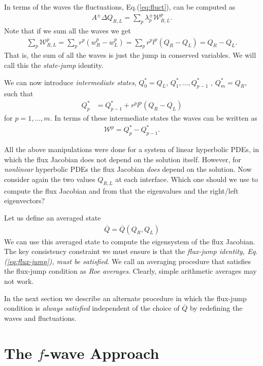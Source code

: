 \documentclass[12pt]{article}
\theoremstyle{definition}
\theoremstyle{definition}
\theoremstyle{definition}
\newcommand{\eqr}[1]{Eq.\thinspace(#1)}
\begin{document}
In terms of the waves the fluctuations, \eqr{\ref{eq:fluct}}, can be
computed as
\begin{align}
  A^\pm\Delta Q_{R,L} = \sum_p \lambda^\pm_p \mathcal{W}_{R,L}^p.
\end{align}
Note that if we sum all the waves we get
\begin{align}
  \sum_p \mathcal{W}_{R,L}^p = \sum_p r^p (w_R^p-w_L^p) = \sum_p  r^p  l^p(Q_R-Q_L) = Q_R-Q_L.
  \label{eq:state-jump}
\end{align}
That is, the sum of all the waves is just the jump in conserved
variables. We will call this the \emph{state-jump} identity.

We can now introduce \emph{intermediate states}, $Q_0^* = Q_L$,
$Q^*_1, \ldots, Q_{p-1}^*$ , $Q_m^* = Q_R$, such that
\begin{align}
  Q^*_p &= Q_{p-1}^* + r^p l^p (Q_R-Q_L)
\end{align}
for $p=1,\ldots,m$. In terms of these intermediate states the waves
can be written as
\begin{align}
  \mathcal{W}^p = Q_{p}^* - Q_{p-1}^*.
\end{align}

All the above manipulations were done for a system of linear
hyperbolic PDEs, in which the flux Jacobian does not depend on the
solution itself. However, for \emph{nonlinear} hyperbolic PDEs the
flux Jacobian \emph{does} depend on the solution. Now consider again
the two values $Q_{R,L}$ at each interface. Which one should we use to
compute the flux Jacobian and from that the eigenvalues and the
right/left eigenvectors?

Let us define an averaged state
\begin{align}
  \overline{Q} = \overline{Q}(Q_R, Q_L)
\end{align}
We can use this averaged state to compute the eigensystem of the flux
Jacobian. The key consistency constraint we must ensure is that the
\emph{flux-jump identity, \eqr{\ref{eq:flux-jump}}, must be
  satisfied}. We call an averaging procedure that satisfies the
flux-jump condition as \emph{Roe averages}. Clearly, simple arithmetic
averages may not work.

In the next section we describe an alternate procedure in which the
flux-jump condition is \emph{always satisfied} independent of the
choice of $\overline{Q}$ by redefining the waves and fluctuations.

\section{The $f$-wave Approach}
\end{document}
